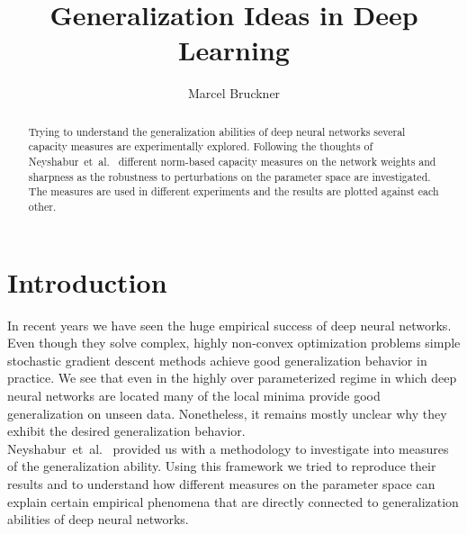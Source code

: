 \documentclass[a4paper,10pt]{article}
\title{Generalization Ideas in Deep Learning} %
\author{Marcel Bruckner} %
\institute{\textit{Seminar: Optimization and Generalization in Deep Learning}}
\newcommand{\ns}{Neyshabur~et~al.~\cite{neyshabur2017exploring}}
\begin{document}
\maketitle

\begin{abstract}
Trying to understand the generalization abilities of deep neural networks several capacity measures are experimentally explored. Following the thoughts of \ns{} different norm-based capacity measures on the network weights and sharpness as the robustness to perturbations on the parameter space are investigated. The measures are used in different experiments and the results are plotted against each other.
\end{abstract}

\section{Introduction}
In recent years we have seen the huge empirical success of deep neural networks. Even though they solve complex, highly non-convex optimization problems simple stochastic gradient descent methods achieve good generalization behavior in practice. We see that even in the highly over parameterized regime in which deep neural networks are located many of the local minima provide good generalization on unseen data. Nonetheless, it remains mostly unclear why they exhibit the desired generalization behavior.\\
%
\ns{} provided us with a methodology to investigate into measures of the generalization ability. Using this framework we tried to reproduce their results and to understand how different measures on the parameter space can explain certain empirical phenomena that are directly connected to generalization abilities of deep neural networks.
%






\newpage



\newpage

\nocite{*}



\end{document}
